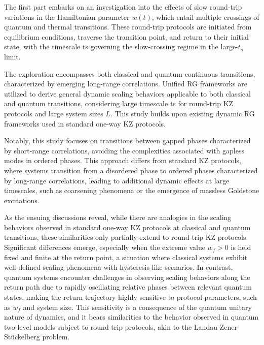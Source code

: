 The first part embarks on an investigation into the effects of slow round-trip variations in the Hamiltonian parameter $w(t)$, which entail multiple crossings of quantum and thermal transitions. These round-trip protocols are initiated from equilibrium conditions, traverse the transition point, and return to their initial state, with the timescale ts governing the slow-crossing regime in the large-$t_s$ limit.

The exploration encompasses both classical and quantum continuous transitions, characterized by emerging long-range correlations. Unified RG frameworks are utilized to derive general dynamic scaling behaviors applicable to both classical and quantum transitions, considering large timescale ts for round-trip KZ protocols and large system sizes $L$. This study builds upon existing dynamic RG frameworks used in standard one-way KZ protocols.

Notably, this study focuses on transitions between gapped phases characterized by short-range correlations, avoiding the complexities associated with gapless modes in ordered phases. This approach differs from standard KZ protocols, where systems transition from a disordered phase to ordered phases characterized by long-range correlations, leading to additional dynamic effects at large timescales, such as coarsening phenomena or the emergence of massless Goldstone excitations.


As the ensuing discussions reveal, while there are analogies in the scaling behaviors observed in standard one-way KZ protocols at classical and quantum transitions, these similarities only partially extend to round-trip KZ protocols. Significant differences emerge, especially when the extreme value $w_f > 0$ is held fixed and finite at the return point, a situation where classical systems exhibit well-defined scaling phenomena with hysteresis-like scenarios. In contrast, quantum systems encounter challenges in observing scaling behaviors along the return path due to rapidly oscillating relative phases between relevant quantum states, making the return trajectory highly sensitive to protocol parameters, such as $w_f$ and system size. This sensitivity is a consequence of the quantum unitary nature of dynamics, and it bears similarities to the behavior observed in quantum two-level models subject to round-trip protocols, akin to the Landau-Zener-Stückelberg problem.\\




